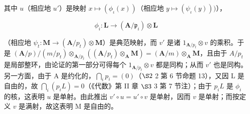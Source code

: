 其中 \(u\)（相应地 \(u'\)）是映射 \(x \mapsto (\phi_{\iota}(x))\)（相应地 \(y \mapsto (\psi_{\iota}(y)))\)），

\[
\phi_ {i} \colon \mathbf {L} \rightarrow (\mathbf {A} / \mathfrak {p} _ {i}) \otimes \mathbf {L}
\]

（相应地 \(\psi_{t}\colon\mathbf{M}\to(\mathbf{A}/p_{t})\otimes\mathbf{M}\)）是典范映射，而 \(v'\) 是诸 \(1_{\mathbf{A}/p_{t}}\otimes v\) 的乘积。于是 \((\mathbf{A}/p)/(m/p_{t})\otimes_{\mathbf{A}/p_{t}}((\mathbf{A}/p_{t})\otimes_{\mathbf{A}}\mathbf{M})=(\mathbf{A}/m)\otimes_{\mathbf{A}}\mathbf{M}\)，且由于 \(A/p_{t}\) 是局部整环，由论证的第一部分可得每个 \(1_{\mathbf{A}/p_{t}}\otimes v\) 都是同构；从而 \(v'\) 也是同构。另一方面，由于 A 是约化的，\(\bigcap_{i} p_{i} = (0)\)（\(\S 2\) 2 第 6 节命题 13），又因 L 是自由的，故 \(\bigcap_{i} (p_{i} L) = 0\)（《代数》第 II 章 \(\S 3\) 3 第 7 节注）；由于 \(p_{i} L\) 是 \(\phi_{i}\) 的核，这表明 \(u\) 是单射。由此推出 \(v' \circ u = u' \circ v\) 是单射，因而 \(v\) 是单射；而按定义 \(v\) 是满射，故这表明 M 是自由的。

